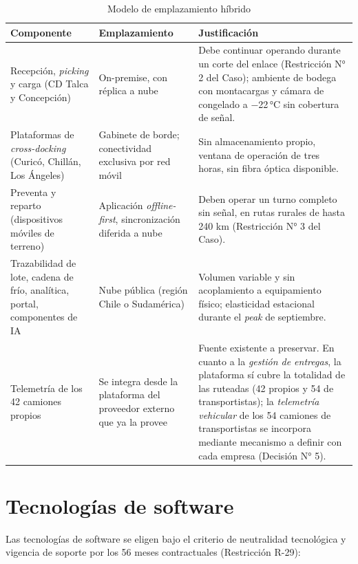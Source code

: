 \begin{table}[htbp]
\centering
\small
\caption{Modelo de emplazamiento híbrido}
\label{tab:emplazamiento}
\begin{tabularx}{\textwidth}{@{}L{5.4cm}L{4.6cm}X@{}}
\toprule
\textbf{Componente} & \textbf{Emplazamiento} & \textbf{Justificación} \\
\midrule
Recepción, \emph{picking} y carga
(CD Talca y Concepción) &
On-premise, con réplica a nube &
Debe continuar operando durante un corte del enlace (Restricción N° 2 del Caso);
ambiente de bodega con montacargas y cámara de congelado a $-$22\,°C sin cobertura de
señal. \\
\addlinespace
Plataformas de \emph{cross-docking}
(Curicó, Chillán, Los Ángeles) &
Gabinete de borde; conectividad exclusiva por red móvil &
Sin almacenamiento propio, ventana de operación de tres horas, sin fibra óptica
disponible. \\
\addlinespace
Preventa y reparto (dispositivos
móviles de terreno) &
Aplicación \emph{offline-first}, sincronización diferida a nube &
Deben operar un turno completo sin señal, en rutas rurales de hasta 240 km
(Restricción N° 3 del Caso). \\
\addlinespace
Trazabilidad de lote, cadena de frío,
analítica, portal, componentes de IA &
Nube pública (región Chile o Sudamérica) &
Volumen variable y sin acoplamiento a equipamiento físico; elasticidad estacional
durante el \emph{peak} de septiembre. \\
\addlinespace
Telemetría de los 42 camiones propios &
Se integra desde la plataforma del proveedor externo que ya la provee &
Fuente existente a preservar. En cuanto a la \emph{gestión de entregas}, la plataforma
sí cubre la totalidad de las ruteadas (42 propios y 54 de transportistas); la
\emph{telemetría vehicular} de los 54 camiones de transportistas se incorpora mediante
mecanismo a definir con cada empresa (Decisión N° 5). \\
\bottomrule
\end{tabularx}
\end{table}

\section{Tecnologías de software}

Las tecnologías de software se eligen bajo el criterio de neutralidad tecnológica y
vigencia de soporte por los 56 meses contractuales (Restricción R-29):

